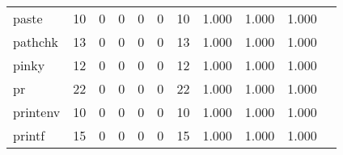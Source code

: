 \begin{longtable}{lp{1.2cm}p{1.2cm}p{1.2cm}p{1.2cm}p{1.2cm}p{1.2cm}p{1.2cm}p{1.2cm}p{1.2cm}p{1.2cm}}
paste     &                                    10 &                                                  0 &                                                  0 &                                                  0 &                                                  0 &                                                 10 &                                         1.000 &                                              1.000 &                                              1.000 \\
pathchk   &                                    13 &                                                  0 &                                                  0 &                                                  0 &                                                  0 &                                                 13 &                                         1.000 &                                              1.000 &                                              1.000 \\
pinky     &                                    12 &                                                  0 &                                                  0 &                                                  0 &                                                  0 &                                                 12 &                                         1.000 &                                              1.000 &                                              1.000 \\
pr        &                                    22 &                                                  0 &                                                  0 &                                                  0 &                                                  0 &                                                 22 &                                         1.000 &                                              1.000 &                                              1.000 \\
printenv  &                                    10 &                                                  0 &                                                  0 &                                                  0 &                                                  0 &                                                 10 &                                         1.000 &                                              1.000 &                                              1.000 \\
printf    &                                    15 &                                                  0 &                                                  0 &                                                  0 &                                                  0 &                                                 15 &                                         1.000 &                                              1.000 &                                              1.000 \\

\end{longtable}
